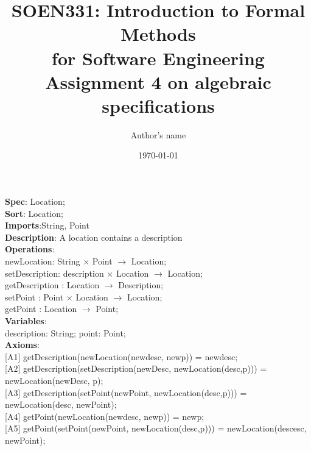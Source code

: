 \documentclass[12pt]{article}
\title{SOEN331: Introduction to Formal Methods\\for Software Engineering\\
Assignment 4 on algebraic specifications}
\author{Author's name}
\date{\today}
\begin{document}
\begin{spacing}{1.5}

\maketitle

\noindent \textbf{Spec}: Location;\\
\noindent \textbf{Sort}: Location;\\
\noindent \textbf{Imports}:String, Point\\
\noindent \textbf{Description}: A location contains a description \\
\noindent \textbf{Operations}:\\
\hspace*{5mm} newLocation: String $\times$ Point $\rightarrow$ Location;\\
\hspace*{5mm} setDescription: description $\times$ Location $\rightarrow$ Location;\\
\hspace*{5mm} getDescription : Location $\rightarrow$ Description;\\
\hspace*{5mm} setPoint : Point $\times$ Location $\rightarrow$ Location;\\
\hspace*{5mm} getPoint : Location $\rightarrow$ Point;\\
\noindent \textbf{Variables}:\\
\hspace*{5mm} description: String; point: Point;\\
\noindent \textbf{Axioms}:\\
\hspace*{5mm} [A1] getDescription(newLocation(newdesc, newp)) = newdesc;\\
\hspace*{5mm} [A2] getDescription(setDescription(newDesc, newLocation(desc,p))) = newLocation(newDesc, p);\\
\hspace*{5mm} [A3] getDescription(setPoint(newPoint, newLocation(desc,p))) = newLocation(desc, newPoint);\\
\hspace*{5mm} [A4] getPoint(newLocation(newdesc, newp)) = newp;\\
\hspace*{5mm} [A5] getPoint(setPoint(newPoint, newLocation(desc,p))) = newLocation(descesc, newPoint);\\

\end{spacing}
\end{document}
